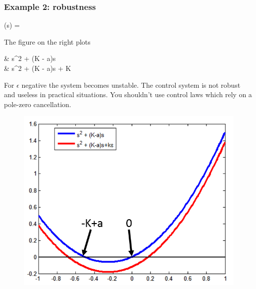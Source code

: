 \begin{frame}
	\frametitle{Example 2: robustness}
	\begin{minipage}{0.5\linewidth}
		\begin{flalign*}
			(s) = 
		\end{flalign*}
		The figure on the right plots
		\begin{flalign*}
			&{\color{blue} s^2 + (K - a)s} \\
			&{\color{red} s^2 + (K - a)s + \epsilon K}
		\end{flalign*}
		For $\epsilon$ negative the system becomes unstable. The control system is not robust and useless in practical situations. You shouldn’t use control laws which rely on a pole-zero cancellation. 
	\end{minipage}
	\hfill
	\begin{minipage}{0.4\linewidth}
		\begin{figure}
			\center
			\includegraphics[width=1.2\linewidth]{robustness-example}
			\label{fig:robustness-example}
		\end{figure}
	\end{minipage}
\end{frame}


